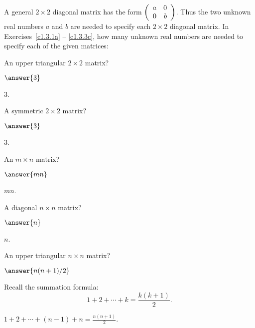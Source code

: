 \documentclass{ximera}
\begin{document}
\noindent A general $2\times 2$ diagonal matrix has the form
$\left(\begin{array}{rr} a & 0\\ 0 &b\end{array}\right)$.  Thus the two unknown real numbers $a$ and $b$ are
needed to specify each $2\times 2$ diagonal matrix.  In
Exercises~\ref{c1.3.1a} -- \ref{c1.3.3c}, how many unknown real numbers
are needed to specify each of the given matrices:
\begin{exercise}  \label{c1.3.1a}
An upper triangular $2\times 2$ matrix? \begin{prompt}$\answer{3}$\end{prompt}

\begin{solution}
$3$.

\end{solution}
\end{exercise}
\begin{exercise}  \label{c1.3.1b}
A symmetric $2\times 2$ matrix? \begin{prompt}$\answer{3}$\end{prompt}

\begin{solution}
$3$.

\end{solution}
\end{exercise}
\begin{exercise}  \label{c1.3.2}
An $m\times n$ matrix? \begin{prompt}$\answer{mn}$\end{prompt}

\begin{solution}
$mn$.

\end{solution}
\end{exercise}
\begin{exercise}  \label{c1.3.3a}
A diagonal $n\times n$ matrix? \begin{prompt}$\answer{n}$\end{prompt}

\begin{solution}
$n$.

\end{solution}
\end{exercise}
\begin{exercise}  \label{c1.3.3b}
  An upper triangular $n\times n$ matrix? \begin{prompt}$\answer{n(n+1)/2}$\end{prompt}
  \begin{hint}Recall the
    summation formula:
    \[
      1 + 2 + \cdots + k = \frac{k(k+1)}{2}.
    \]
  \end{hint}

\begin{solution}
$1 + 2 + \cdots + (n-1) + n = \frac{n(n + 1)}{2}$.

\end{solution}
\end{exercise}
\end{document}
